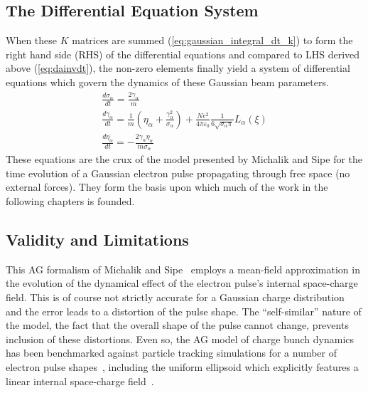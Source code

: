 \subsection{The Differential Equation System}

When these $K$ matrices are summed (\ref{eq:gaussian_integral_dt_k}) to form the right hand side (RHS) of the differential equations and compared to LHS derived above (\ref{eq:dainvdt}), the non-zero elements finally yield a system of differential equations which govern the dynamics of these Gaussian beam parameters.
\begin{subequations} \label{eq:ag_original}
\begin{gather}
  \frac{d\sigma_{\alpha}}{dt} = \frac{2\gamma_{\alpha}}{m} \\
  \frac{d\gamma_{\alpha}}{dt} = \frac{1}{m} \left(\eta_{\alpha} + \frac{\gamma_{\alpha}^2}{\sigma_{\alpha}} \right) 
    + \frac{N e^2}{4\pi\varepsilon_0} \frac{1}{6 \sqrt{\sigma_{\alpha}\pi}} L_{\alpha}(\xi)\\
  \frac{d\eta_{\alpha}}{dt} = - \frac{2 \gamma_{\alpha} \eta_{\alpha}}{m \sigma_{\alpha}}
\end{gather}
\end{subequations}
These equations are the crux of the model presented by Michalik and Sipe for the time evolution of a Gaussian electron pulse propagating through free space (no external forces).
They form the basis upon which much of the work in the following chapters is founded.

\subsection{Validity and Limitations}

This AG formalism of Michalik and Sipe~\cite{michalik_analytic_2006} employs a mean-field approximation in the evolution of the dynamical effect of the electron pulse's internal space-charge field.
This is of course not strictly accurate for a Gaussian charge distribution and the error leads to a distortion of the pulse shape.
The ``self-similar'' nature of the model, the fact that the overall shape of the pulse cannot change, prevents inclusion of these distortions.
Even so, the AG model of charge bunch dynamics has been benchmarked against particle tracking simulations for a number of electron pulse shapes~\cite{michalik_analytic_2006,michalik_evolution_2009}, including the uniform ellipsoid which explicitly features a linear internal space-charge field~\cite{luiten_how_2004}.

